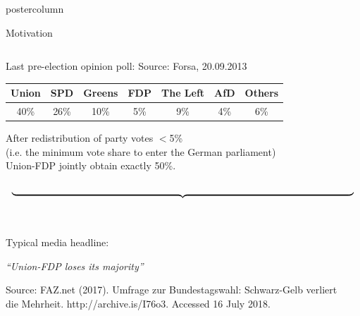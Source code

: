 \documentclass[final,hyperref={pdfpagelabels=false}]{beamer}
\newcommand{\darkgray}[1]{\textcolor{koaladarkgray}{#1}}
\newcommand{\lightgray}[1]{\textcolor{koalagray}{#1}}
\begin{document}
\begin{frame}
\begin{columns}
\begin{column}{1\textwidth}
\begin{beamercolorbox}[center,wd=\textwidth]{postercolumn}
\begin{minipage}[T]{.95\textwidth}
\begin{block}{\footnotesize Motivation}
{{\begin{minipage}{.96\textwidth}
\begin{columns}[t]
  \begin{column}{.29\textwidth}
  \darkgray{Last pre-election opinion poll:} \lightgray{\tiny Source: Forsa, 20.09.2013}
  \\[2.5ex]
  \begin{center}\centering
  \begin{tabular}{ccccccc}
  \toprule
  \darkgray{Union} & {\footnotesize \lightgray{SPD}} & {\footnotesize \lightgray{Greens}} & \darkgray{FDP} & {\footnotesize \lightgray{The Left}} & {\footnotesize \lightgray{AfD}} & {\footnotesize \lightgray{Others}} \\ \midrule
  \darkgray{40\%} & {\footnotesize \lightgray{26\%}} & {\footnotesize \lightgray{10\%}} & \darkgray{5\%} & {\footnotesize \lightgray{9\%}} & {\footnotesize \lightgray{4\%}} & {\footnotesize \lightgray{6\%}} \\
  \bottomrule
  \end{tabular}
  \end{center}
  \vspace{1.5ex}
  \begin{center}\centering
  \darkgray{After redistribution} \lightgray{\footnotesize of party votes $<$5\% \\ (i.e. the minimum vote share to enter the German parliament)} \\
  \darkgray{Union-FDP} \lightgray{\footnotesize jointly} \darkgray{obtain} \lightgray{\footnotesize exactly} \darkgray{50\%}.
  \end{center}
  \vspace{-3ex}
  \textcolor{koalablue}{$$ \underbrace{\resizebox{\hsize}{!}{ }}_{ } $$}
  \ \\ \vspace{-2ex}
  \begin{mdleftred}
  \begin{minipage}{\textwidth}
  \lightgray{\footnotesize Typical media headline:}
  \\
  \begin{center}\centering
  \vspace{-2ex}
  \darkgray{\textit{``Union-FDP loses its majority''}}
  \vspace{-.2ex}
  \end{center}
  \lightgray{\tiny Source: FAZ.net (2017). Umfrage zur Bundestagswahl: Schwarz-Gelb verliert \\[-2ex]
  die Mehrheit. http://archive.is/I76o3. Accessed 16 July 2018.}
  \end{minipage}
  \end{mdleftred}
  \end{column}


\end{columns}
\end{minipage}}}
\end{block}
\end{minipage}
\end{beamercolorbox}
\end{column}
\end{columns}
\end{frame}
\end{document}
